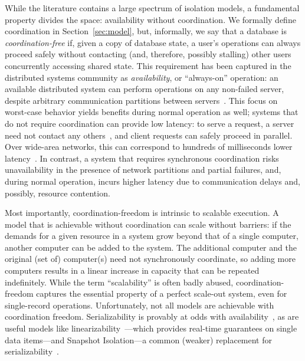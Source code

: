  While the literature contains
a large spectrum of isolation models, a fundamental property divides
the space: availability without coordination. We formally define
coordination in Section~\ref{sec:model}, but, informally, we say that
a database is \textit{coordination-free} if, given a copy of database
state, a user's operations can always proceed safely without
contacting (and, therefore, possibly stalling) other users
concurrently accessing shared state. This requirement has been
captured in the distributed systems community as
\textit{availability}, or ``always-on'' operation: an available
distributed system can perform operations on any non-failed server,
despite arbitrary communication partitions between
servers~\cite{gilbert-cap}. This focus on worst-case behavior yields
benefits during normal operation as well; systems that do not require
coordination can provide low latency: to serve a request, a server
need not contact any others~\cite{pacelc}, and client requests can
safely proceed in parallel. Over wide-area networks, this can
correspond to hundreds of milliseconds lower
latency~\cite{hat-vldb}. In contrast, a system that requires
synchronous coordination risks unavailability in the presence of
network partitions and partial failures, and, during normal operation,
incurs higher latency due to communication delays and, possibly,
resource contention.



Most importantly, coordination-freedom is intrinsic to scalable
execution. A model that is achievable without coordination can scale
without barriers: if the demands for a given resource in a system grow
beyond that of a single computer, another computer can be added to the
system. The additional computer and the original (set of) computer(s)
need not synchronously coordinate, so adding more computers results in
a linear increase in capacity that can be repeated indefinitely. While
the term ``scalability'' is often badly abused, coordination-freedom
captures the essential property of a perfect scale-out system, even
for single-record operations.  Unfortunately, not all models are
achievable with coordination freedom. Serializability is provably at
odds with availability~\cite{davidson-survey}, as are useful models
like linearizability~\cite{gilbert-cap}---which provides real-time
guarantees on single data items---and Snapshot Isolation---a common
(weaker) replacement for serializability~\cite{hat-vldb}.

